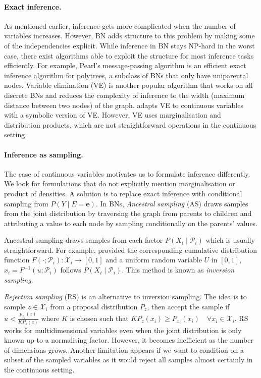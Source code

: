 \paragraph{Exact inference.}
As mentioned earlier, inference gets more complicated when the number of variables increases. However, BN adds structure to this problem by making some of the independencies explicit. While inference in BN stays NP-hard in the worst case, there exist algorithms able to exploit the structure for most inference tasks efficiently. For example, Pearl's message-passing algorithm is an efficient exact inference algorithm for polytrees, a subclass of BNs that only have uniparental nodes. Variable elimination (VE) is another popular algorithm that works on all discrete BNs and reduces the complexity of inference to the width (maximum distance between two nodes) of the graph. \citet{sanner2012symbolic} adapts VE to continuous variables with a symbolic version of VE. However, VE uses marginalisation and distribution products, which are not straightforward operations in the continuous setting.

\paragraph{Inference as sampling.}
The case of continuous variables motivates us to formulate inference differently. We look for formulations that do not explicitly mention marginalisation or product of densities. A solution is to replace exact inference with conditional sampling from $P(Y\mid E=\bm{e})$. In BNs, \textit{Ancestral sampling} (AS) draws samples from the joint distribution by traversing the graph from parents to children and attributing a value to each node by sampling conditionally on the parents' values.

Ancestral sampling draws samples from each factor $P(X_i\mid \mathcal{P}_i)$ which is usually straightforward. For example, provided the corresponding cumulative distribution function $F(\cdot;\mathcal{P}_i): \mathcal{X}_i \rightarrow \left[0, 1 \right]$ and a uniform random variable $U$ in $\left[0, 1\right]$, $x_i=F^{-1}(u;\mathcal{P}_i)$ follows $P(X_i\mid \mathcal{P}_i)$. This method is known as \textit{inversion sampling}.

\textit{Rejection sampling} (RS) is an alternative to inversion sampling. The idea is to sample $z \in \mathcal{X}_i$ from a proposal distribution $P_z$, then accept the sample if $u< \frac{p_{x_i}(z)}{K P_z(z)} $ where $K$ is chosen such that $ K P_z(x_i) \geq P_{x_i}(x_i) \quad \forall x_i \in \mathcal{X}_i$. RS works for multidimensional variables even when the joint distribution is only known up to a normalising factor. However, it becomes inefficient as the number of dimensions grows. Another limitation appears if we want to condition on a subset of the sampled variables as it would reject all samples almost certainly in the continuous setting.

